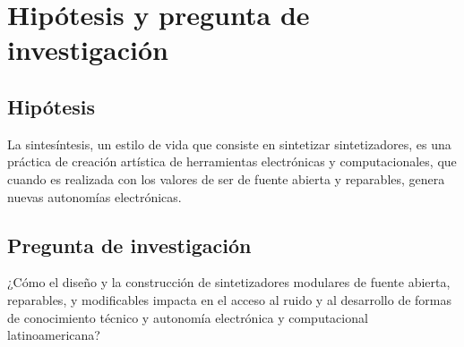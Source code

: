 \documentclass[../proyecto.tex]{subfiles}
\begin{document}
\chapter{Hipótesis y pregunta de investigación}

\section{Hipótesis}

La sintesíntesis, un estilo de vida que consiste en sintetizar sintetizadores, es una práctica de creación artística de herramientas electrónicas y computacionales, que cuando es realizada con los valores de ser de fuente abierta y reparables, genera nuevas autonomías electrónicas.

\section{Pregunta de investigación}

¿Cómo el diseño y la construcción de sintetizadores modulares de fuente abierta, reparables, y modificables impacta en el acceso al ruido y al desarrollo de formas de conocimiento técnico y autonomía electrónica y computacional latinoamericana?

\end{document}
